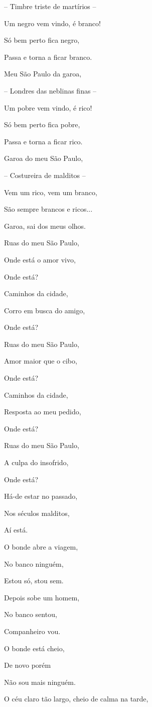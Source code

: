 -- Timbre triste de martírios --

Um negro vem vindo, é branco!

Só bem perto fica negro,

Passa e torna a ficar branco.

Meu São Paulo da garoa,

-- Londres das neblinas finas --

Um pobre vem vindo, é rico!

Só bem perto fica pobre,

Passa e torna a ficar rico.

Garoa do meu São Paulo,

-- Costureira de malditos --

Vem um rico, vem um branco,

São sempre brancos e ricos...

Garoa, sai dos meus olhos.

Ruas do meu São Paulo,

Onde está o amor vivo,

Onde está?

Caminhos da cidade,

Corro em busca do amigo,

Onde está?

Ruas do meu São Paulo,

Amor maior que o cibo,

Onde está?

Caminhos da cidade,

Resposta ao meu pedido,

Onde está?

Ruas do meu São Paulo,

A culpa do insofrido,

Onde está?

Há-de estar no passado,

Nos séculos malditos,

Aí está.

O bonde abre a viagem,

No banco ninguém,

Estou só, stou sem.

Depois sobe um homem,

No banco sentou,

Companheiro vou.

O bonde está cheio,

De novo porém

Não sou mais ninguém.

O céu claro tão largo, cheio de calma na tarde,

